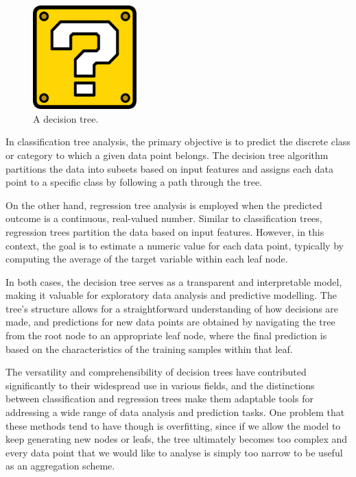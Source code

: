 \begin{figure}[h]
	\includegraphics[width=4cm]{Figures/missing.png}
	\centering
	\caption{A decision tree.}
	\label{building_BASS}
\end{figure}

In classification tree analysis, the primary objective is to predict the discrete class or category to which a given data point belongs. The decision tree algorithm partitions the data into subsets based on input features and assigns each data point to a specific class by following a path through the tree.

On the other hand, regression tree analysis is employed when the predicted outcome is a continuous, real-valued number. Similar to classification trees, regression trees partition the data based on input features. However, in this context, the goal is to estimate a numeric value for each data point, typically by computing the average of the target variable within each leaf node.

In both cases, the decision tree serves as a transparent and interpretable model, making it valuable for exploratory data analysis and predictive modelling. The tree's structure allows for a straightforward understanding of how decisions are made, and predictions for new data points are obtained by navigating the tree from the root node to an appropriate leaf node, where the final prediction is based on the characteristics of the training samples within that leaf.

The versatility and comprehensibility of decision trees have contributed significantly to their widespread use in various fields, and the distinctions between classification and regression trees make them adaptable tools for addressing a wide range of data analysis and prediction tasks. One problem that these methods tend to have though is overfitting, since if we allow the model to keep generating new nodes or leafs, the tree ultimately becomes too complex and every data point that we would like to analyse is simply too narrow to be useful as an aggregation scheme. 

